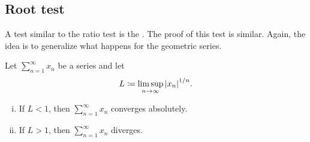 

\subsection{Root test}

A test similar to the ratio test is the
\emph{}.  The proof of this test is similar.
Again, the idea is to generalize what happens for the geometric series.

\begin{prop}
Let $\sum_{n=1}^\infty x_n$ be a series and let
\begin{equation*}
L \coloneqq \limsup_{n\to\infty} {\lvert {x_n} \rvert}^{1/n} .
\end{equation*}
\begin{enumerate}[(i)]
\item If $L < 1$, then $\sum_{n=1}^\infty x_n$ converges absolutely.
\item If $L > 1$, then $\sum_{n=1}^\infty x_n$ diverges.
\end{enumerate}
\end{prop}

